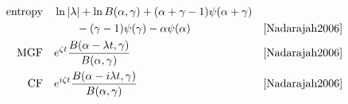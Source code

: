 \begin{table*}[tp!]
\begin{align*}
\text{entropy} \quad  & \ln |\lambda| +\ln B(\alpha,\gamma) + (\alpha+\gamma-1) \psi(\alpha+\gamma) 
\\ & \qquad 
- (\gamma -1) \psi(\gamma) - \alpha \psi(\alpha)  &\text{\cite{Nadarajah2006}}
\\
\text{MGF} \quad  &e^{\zeta t }  \frac{B(\alpha-\lambda t, \gamma) }{B(\alpha,\gamma)}  & \text{\cite{Nadarajah2006}}
\\                                                                                                                                              
\text{CF} \quad  & e^{i \zeta t }   \frac{B(\alpha-i \lambda t, \gamma) }{B(\alpha,\gamma)}   & \text{\cite{Nadarajah2006}}
\end{align*}
\end{table*}
